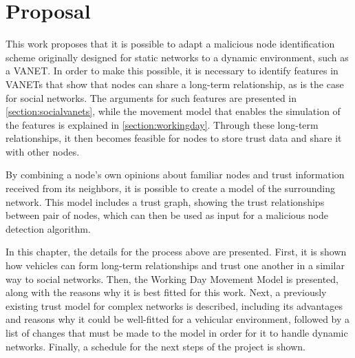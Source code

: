 \chapter{Proposal}
\label{chap:proposal}

This work proposes that it is possible to adapt a malicious node identification scheme originally designed for static networks to a dynamic environment, such as a VANET.
In order to make this possible, it is necessary to identify features in VANETs that show that nodes can share a long-term relationship, as is the case for social networks.
The arguments for such features are presented in \autoref{section:socialvanets}, while the movement model that enables the simulation of the features is explained in \autoref{section:workingday}.
Through these long-term relationships, it then becomes feasible for nodes to store trust data and share it with other nodes.

By combining a node's own opinions about familiar nodes and trust information received from its neighbors, it is possible to create a model of the surrounding network.
This model includes a trust graph, showing the trust relationships between pair of nodes, which can then be used as input for a malicious node detection algorithm.


In this chapter, the details for the process above are presented.
First, it is shown how vehicles can form long-term relationships and trust one another in a similar way to social networks.
Then, the Working Day Movement Model is presented, along with the reasons why it is best fitted for this work.
Next, a previously existing trust model for complex networks is described, including its advantages and reasons why it could be well-fitted for a vehicular environment, followed by a list of changes that must be made to the model in order for it to handle dynamic networks.
Finally, a schedule for the next steps of the project is shown.

